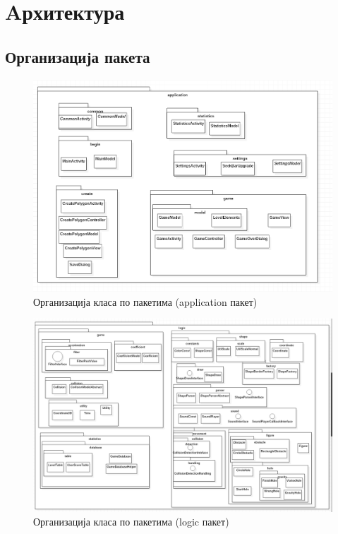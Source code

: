 \chapter{Aрхитектура} \label{Architecture}

\section{Организација пакета}

\begin{figure}[htb!]
\begin{center}
\includegraphics[scale=.7]{pictures/UML/package/application}
\caption{Организација класа по пакетима (application пакет)}\label{fig:umlPackageApp}
\end{center}
\end{figure}

\begin{figure}[htb!]
\begin{center}
\includegraphics[scale=.6]{pictures/UML/package/logic}
\caption{Организација класа по пакетима (logic пакет)}\label{fig:umlPackageLog}
\end{center}
\end{figure}

